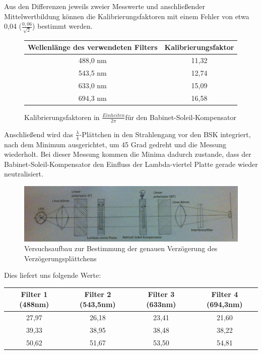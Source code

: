 \documentclass[bigchapter,colorback,accentcolor=tud4b,linedtoc,11pt]{tudreport}
\begin{document}
Aus den Differenzen jeweils zweier Messwerte und anschließender Mittelwertbildung können die Kalibrierungsfaktoren mit einem Fehler von etwa 0,04 ($\frac{0,06}{\sqrt{2}}$) bestimmt werden.

\begin{figure}[h]
  \begin{center}
    \begin{tabular}{|c|c|}
      \hline
      Wellenlänge des verwendeten Filters & Kalibrierungsfaktor \\ \hline
      488,0 nm                            & 11,32               \\ \hline
      543,5 nm                            & 12,74               \\ \hline
      633,0 nm                            & 15,09               \\ \hline
      694,3 nm                            & 16,58               \\ \hline
    \end{tabular}
  \end{center}
  \caption{Kalibrierungsfaktoren in $\frac{Einheiten}{2\pi}$für den Babinet-Soleil-Kompensator}
\end{figure}


Anschließend wird das $\frac{\lambda}{4}$-Plättchen in den Strahlengang vor den BSK integriert, nach dem Minimum ausgerichtet, um 45 Grad gedreht und die Messung wiederholt. Bei dieser Messung kommen die Minima dadurch zustande, dass der Babinet-Soleil-Kompensator den Einfluss der Lambda-viertel Platte gerade wieder neutralisiert.

\begin{figure}[h]
  \centering
    \includegraphics[width=150mm]{img/skizzen/versuch_c_2.jpg}
    \caption{Versuchsaufbau zur Bestimmung der genauen Verzögerung des Verzögerungsplättchens}
\end{figure}

Dies liefert uns folgende Werte:

\begin{center}
  \begin{tabular}{|c|c|c|c|}
    \hline
        Filter 1 (488nm) & Filter 2 (543,5nm) & Filter 3 (633nm) & Filter 4 (694,3nm) \\ \hline
        27,97 & 26,18 & 23,41 & 21,60 \\ \hline
        39,33 & 38,95 & 38,48 & 38,22 \\ \hline
        50,62 & 51,67 & 53,50 & 54,81 \\ \hline
	\end{tabular}
\end{center}
\end{document}
